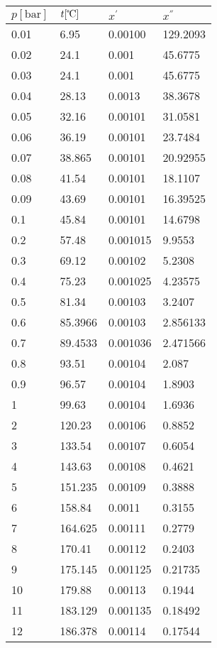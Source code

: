 \documentclass[twocolumn]{article}
\begin{document}
\begin{tabular}{l|l|l|l}
$p [\text{bar}] $ & $t [\text{\textcelsius{}}]$ & $x^{'}$ & $x^{''}$ \\ \hline
0.01	&	6.95	&	0.00100	&	129.2093  \\ \hline
0.02	&	24.1	&	0.001	&	45.6775  \\ \hline
0.03	&	24.1	&	0.001	&	45.6775  \\ \hline
0.04	&	28.13	&	0.0013	&	38.3678  \\ \hline
0.05	&	32.16	&	0.00101 &	31.0581  \\ \hline
0.06	&	36.19	&	0.00101	&	23.7484  \\ \hline
0.07	&	38.865	&	0.00101	&	20.92955  \\ \hline
0.08	&	41.54	&	0.00101	&	18.1107  \\ \hline
0.09	&	43.69	&	0.00101	&	16.39525  \\ \hline
0.1	&	45.84	&	0.00101	&	14.6798  \\ \hline
0.2	&	57.48	&	0.001015	&	9.9553  \\ \hline
0.3	&	69.12	&	0.00102	&	5.2308  \\ \hline
0.4	&	75.23	&	0.001025	&	4.23575  \\ \hline
0.5	&	81.34	&	0.00103	&	3.2407  \\ \hline
0.6	&	85.3966&	0.00103&	2.856133\\ \hline
0.7	&	89.4533&	0.001036&	2.471566\\ \hline
0.8	&	93.51	&	0.00104	&	2.087  \\ \hline
0.9	&	96.57	&	0.00104	&	1.8903  \\ \hline
1	&	99.63	&	0.00104	&	1.6936  \\ \hline
2	&	120.23	&	0.00106	&	0.8852  \\ \hline
3	&	133.54	&	0.00107	&	0.6054  \\ \hline
4	&	143.63	&	0.00108	&	0.4621  \\ \hline
5	&	151.235	&	0.00109	&	0.3888  \\ \hline
6	&	158.84	&	0.0011	&	0.3155  \\ \hline
7	&	164.625	&	0.00111	&	0.2779  \\ \hline
8	&	170.41	&	0.00112	&	0.2403  \\ \hline
9	&	175.145	&	0.001125	&	0.21735  \\ \hline
10	&	179.88	&	0.00113	&	0.1944  \\ \hline
11	&	183.129	&	0.001135	&	0.18492  \\ \hline
12	&	186.378	&	0.00114	&	0.17544  \\ \hline

\end{tabular}
\end{document}
